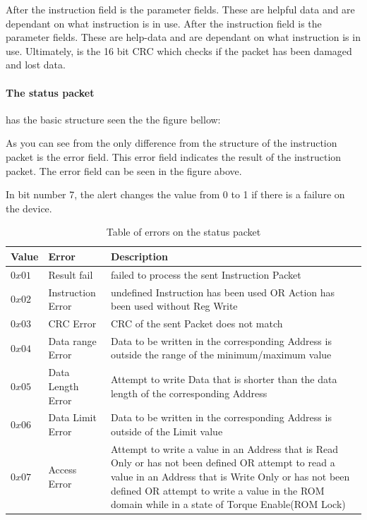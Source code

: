 After the instruction field is the parameter fields. These are helpful data and are dependant on what instruction is in use. After the instruction field is the parameter fields. These are help-data and are dependant on what instruction is in use. Ultimately, is the 16 bit CRC which checks if the packet has been damaged and lost data.  
\\
\paragraph{The status packet} has the basic structure seen the the figure bellow:

As you can see from the only difference from the structure of the instruction packet is the error field.
This error field indicates the result of the instruction packet. The error field can be seen in the figure above. 

In bit number 7, the alert changes the value from 0 to 1 if there is a failure on the device. 
\begin{table}[H]
    \centering
    \begin{tabular}{|P{1.5cm}||P{2cm}||P{9cm}|}\hline
       \textbf{Value}  & \textbf{Error} & \textbf{Description} \\ \hline
        $0x01$ & Result fail &  failed to process the sent Instruction Packet\\ \hline
        $0x02$ & Instruction Error &  undefined Instruction has been used OR Action has been used without Reg Write\\ \hline
        $0x03$ & CRC Error &  CRC of the sent Packet does not match\\ \hline
        $0x04$ & Data range Error &  Data to be written in the corresponding Address is outside the range of the minimum/maximum value\\ \hline
        $0x05$ & Data Length Error &  Attempt to write Data that is shorter than the data length of the corresponding Address\\ \hline
        $0x06$ & Data Limit Error &  Data to be written in the corresponding Address is outside of the Limit value\\ \hline
        
        $0x07$ & 
        Access Error&  Attempt to write a value in an Address that is Read Only or has not been defined OR  attempt to read a value in an Address that is Write Only or has not been defined OR attempt to write a value in the ROM domain while in a state of Torque Enable(ROM Lock)\\ \hline
    \end{tabular}
    \caption{Table of errors on the status packet}
    \label{tab:Status Errors}
\end{table}


